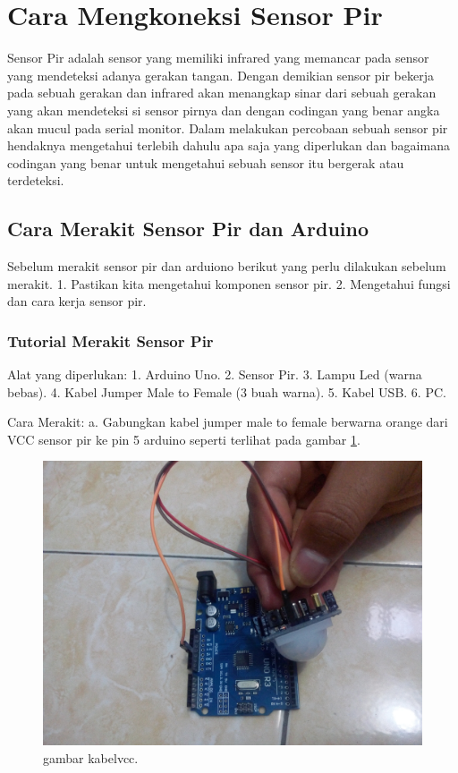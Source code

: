 
\section{Cara Mengkoneksi Sensor Pir}

Sensor Pir adalah sensor yang memiliki infrared yang memancar pada sensor yang mendeteksi adanya gerakan tangan.
Dengan demikian sensor pir bekerja pada sebuah gerakan dan infrared akan menangkap sinar dari sebuah gerakan yang akan mendeteksi si sensor pirnya dan dengan codingan yang benar angka akan mucul pada serial monitor.
Dalam melakukan percobaan sebuah sensor pir hendaknya mengetahui terlebih dahulu apa saja yang diperlukan dan bagaimana codingan yang benar untuk mengetahui sebuah sensor itu bergerak atau terdeteksi.

\subsection {Cara Merakit Sensor Pir dan Arduino}

Sebelum merakit sensor pir dan arduiono berikut yang perlu dilakukan sebelum merakit.
1. Pastikan kita mengetahui komponen sensor pir.
2. Mengetahui fungsi dan cara kerja sensor pir.

\subsubsection {Tutorial Merakit Sensor Pir}
Alat yang diperlukan:
1. Arduino Uno.
2. Sensor Pir.
3. Lampu Led (warna bebas).
4. Kabel Jumper Male to Female (3 buah warna).
5. Kabel USB.
6. PC.

Cara Merakit:
a. Gabungkan kabel jumper male to female berwarna orange dari VCC sensor pir ke pin 5 arduino seperti terlihat pada gambar \ref{carakoneksikabelvcc}.



\begin{figure} [ht]
\centerline{\includegraphics[width=1\textwidth]{figures/kabelvcc.JPG}}
\caption{gambar kabelvcc.}
\label{carakoneksikabelvcc}
\end{figure}

